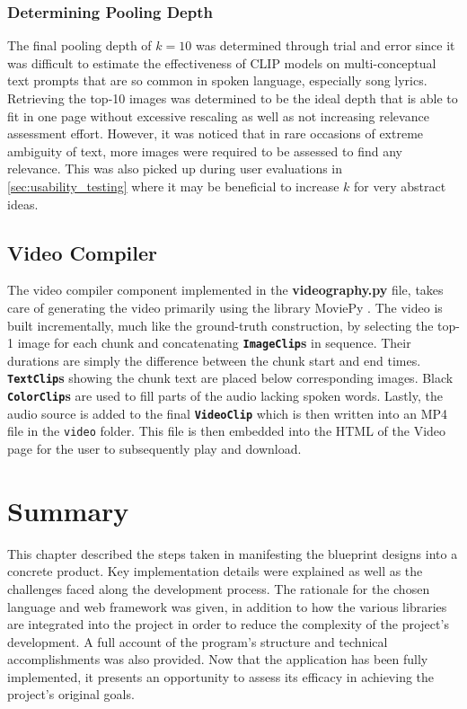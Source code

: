 \documentclass{l4proj}
\begin{document}
\subsubsection{Determining Pooling Depth}
\label{sec:determining_pool_depth}
The final pooling depth of $k=10$ was determined through trial and error since it was difficult to estimate the effectiveness of CLIP models on multi-conceptual text prompts that are so common in spoken language, especially song lyrics. Retrieving the top-10 images was determined to be the ideal depth that is able to fit in one page without excessive rescaling as well as not increasing relevance assessment effort. However, it was noticed that in rare occasions of extreme ambiguity of text, more images were required to be assessed to find any relevance. This was also picked up during user evaluations in \ref{sec:usability_testing} where it may be beneficial to increase $k$ for very abstract ideas.


\subsection{Video Compiler}
The video compiler component implemented in the \textbf{videography.py} file, takes care of generating the video primarily using the library MoviePy \citep{moviepy}. The video is built incrementally, much like the ground-truth construction, by selecting the top-1 image for each chunk and concatenating \textbf{\lstinline|ImageClip|s} in sequence. Their durations are simply the difference between the chunk start and end times. \textbf{\lstinline|TextClip|s} showing the chunk text are placed below corresponding images. Black \textbf{\lstinline|ColorClip|s} are used to fill parts of the audio lacking spoken words. Lastly, the audio source is added to the final \textbf{\lstinline|VideoClip|} which is then written into an MP4 file in the \lstinline|video| folder. This file is then embedded into the HTML of the Video page for the user to subsequently play and download.


\section{Summary}
This chapter described the steps taken in manifesting the blueprint designs into a concrete product. Key implementation details were explained as well as the challenges faced along the development process. The rationale for the chosen language and web framework was given, in addition to how the various libraries are integrated into the project in order to reduce the complexity of the project's development. A full account of the program's structure and technical accomplishments was also provided. Now that the application has been fully implemented, it presents an opportunity to assess its efficacy in achieving the project's original goals.
\end{document}

